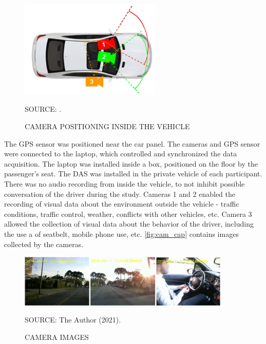 \begin{figure}[!htbp]
    \centering\footnotesize
    \captionsetup{font=footnotesize}
    \caption{CAMERA POSITIONING INSIDE THE VEHICLE}
    \includegraphics[width=0.6\textwidth]{fig/cam_install.png}
    \label{fig:cam_install}
    \par SOURCE: \textcite{Amancio2021}.
\end{figure}

The GPS sensor was positioned near the car panel. The cameras and GPS sensor were connected to the laptop, which controlled and synchronized the data acquisition. The laptop was installed inside a box, positioned on the floor by the passenger's seat. The DAS was installed in the private vehicle of each participant. There was no audio recording from inside the vehicle, to not inhibit possible conversation of the driver during the study. Cameras 1 and 2 enabled the recording of visual data about the environment outside the vehicle - traffic conditions, traffic control, weather, conflicts with other vehicles, etc. Camera 3 allowed the collection of visual data about the behavior of the driver, including the use a of seatbelt, mobile phone use, etc. \autoref{fig:cam_cap} contains images collected by the cameras.  

\begin{figure}[!htbp]
    \centering\footnotesize
    \captionsetup{font=footnotesize}
    \caption{CAMERA IMAGES}
    \includegraphics[width=0.9\textwidth]{fig/cam_cap.png}
    \label{fig:cam_cap}
    \par SOURCE: The Author (2021).
\end{figure}

